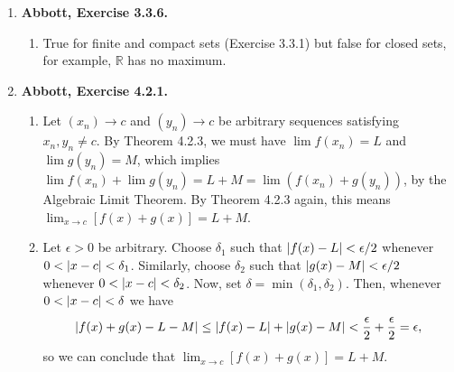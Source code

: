 \documentclass{article}
\DeclarePairedDelimiter\abs{\lvert}{\rvert}
\newcommand{\N}{\mathbb{N}}
\newcommand{\R}{\mathbb{R}}
\newcommand{\ra}{\rightarrow}
\newcommand{\exc}[2][Abbott]{\item \textbf{#1, Exercise #2.}}
\newcommand{\lep}[1][L]{#1et $\epsilon > 0$ be arbitrary}
\begin{document}
\begin{enumerate}
\begin{enumerate}
        \item False. $[0,1] \cup [1,2] \cup [2,3] \dots$ is not bounded, therefore not compact.
        
        \item False. Let $A = (1,2)$ and $K = [0, 3]$. Then $A \cap K = (1, 2)$, which is not closed, therefore not compact.
        
        \item False. For each $n \in \N$ define 
        \begin{equation*}
            F_n = \bigcup_{k=n}^\infty [2k, 2k+1].
        \end{equation*} To see that every $F_n$ is closed, we use Theorem 3.2.8. Let $(a_n)$ be a Cauchy sequence contained in $F_n$. Then, there is some $N \in \N$ such that $\abs*{a_p-a_q} < 1/2$ for all $p, q \geq N$, thus every term of the sequence is eventually in the same interval $[2k, 2k+1]$ for some $k \geq n$. Since $[2k, 2k+1]$ is closed, the limit of $(a_n)$ is in $[2k, 2k+1]$, therefore it is also in $F_n$, so $F_n$ is closed. Now, assume the intersection $\bigcap_{n=1}^\infty F_n \neq \emptyset$. Then, there is some $x \in \R$ such that $x \in F_n$ for all $n \in N$, in particular $x \in F_1$. Then, there must be some $k \geq 1$ such that $x \in [2k, 2k+1]$. But then, $x \notin F_{k+1}$, which is a contradiction. Hence, we can conclude that $\bigcap_{n=1}^\infty F_n = \emptyset$.
    \end{enumerate}
    
    \exc{3.3.6}
    \begin{enumerate}
        \item True for finite and compact sets (Exercise 3.3.1) but false for closed sets, for example, $\R$ has no maximum.
    \end{enumerate}
    
    \exc{4.2.1}
    \begin{enumerate}
        \item Let $(x_n) \ra c$ and $(y_n) \ra c$ be arbitrary sequences satisfying $x_n,y_n \neq c$. By Theorem 4.2.3, we must have $\lim{f(x_n)} = L$ and 
        $\lim{g(y_n)} = M$, which implies $\lim{f(x_n)} + \lim {g(y_n)} = L + M = \lim(f(x_n) + g(y_n))$, by the Algebraic Limit Theorem. By Theorem 4.2.3 again, this means $\lim_{x \ra c} [f(x)+g(x)] = L + M$.
        
        \item \lep. Choose $\delta_1$ such that $\abs*{f(x)-L} < \epsilon/2$ whenever $0 < \abs*{x-c} < \delta_1$. Similarly, choose $\delta_2$ such that $\abs*{g(x)-M} < \epsilon/2$ whenever $0 < \abs*{x-c} < \delta_2$. Now, set $\delta = \min(\delta_1, \delta_2)$. Then, whenever $0 < \abs*{x-c} < \delta$ we have
        \begin{equation*}
            \abs*{f(x)+g(x)-L-M} \leq \abs*{f(x)-L} + \abs*{g(x)-M} <
            \frac{\epsilon}{2} + \frac{\epsilon}{2} = \epsilon,
        \end{equation*} so we can conclude that $\lim_{x \ra c} [f(x) + g(x)] = L + M$.
        

\end{enumerate}
\end{enumerate}
\end{document}
